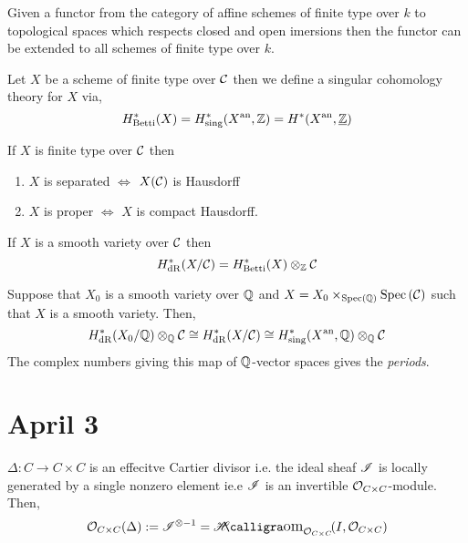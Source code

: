\documentclass[12pt]{article}
\begin{document}
\begin{theorem}
Given a functor from the category of affine schemes of finite type over $k$ to topological spaces which respects closed and open imersions then the functor can be extended to all schemes of finite type over $k$. 
\end{theorem}

\begin{definition}
Let $X$ be a scheme of finite type over $\C$ then we define a singular cohomology theory for $X$ via,
\[ H^*_{\text{Betti}}(X) = H^*_{\text{sing}}(X^{\mathrm{an}}, \mathbb{Z}) = H^*(X^{\mathrm{an}}, \underline{\mathbb{Z}}) \]
\end{definition}

\begin{lemma}
If $X$ is finite type over $\C$ then 
\begin{center}
\begin{enumerate}
\item $X$ is separated $\iff$ $X(\C)$ is Hausdorff 
\item $X$ is proper $\iff$ $X$ is compact Hausdorff. 
\end{enumerate}
\end{center}
\end{lemma}

\begin{theorem}[Grothendieck]
If $X$ is a smooth variety over $\C$ then 
\[ H^*_{\dR}(X/\C) = H^*_{\text{Betti}}(X) \otimes_\Z \C \] 
\end{theorem}

\begin{theorem}
Suppose that $X_0$ is a smooth variety over $\mathbb{Q}$ and $X = X_0 \times_{\Spec{\Q}} \Spec{\C}$ such that $X$ is a smooth variety. Then,
\[ H^*_{\dR}(X_0 / \Q) \otimes_\Q \C \cong H_{\dR}^*(X/\C) \cong H^*_{\text{sing}}(X^\an, \Q) \otimes_\Q \C \] 
The complex numbers giving this map of $\mathbb{Q}$-vector spaces gives the \textit{periods}.
\end{theorem}

\renewcommand{\C}{\mathcal{C}}

\section{April 3}

$\Delta : C \to C \times C$ is an effecitve Cartier divisor i.e. the ideal sheaf $\mathscr{I}$ is locally generated by a single nonzero element ie.e $\mathscr{I}$ is an invertible $\mathcal{O}_{C\times C}$-module. Then,
\[ \struct{C \times C}(\Delta) := \I^{\otimes -1} = \shHomover{\struct{C \times C}}{I}{\struct{C \times C}} \]
\end{document}

